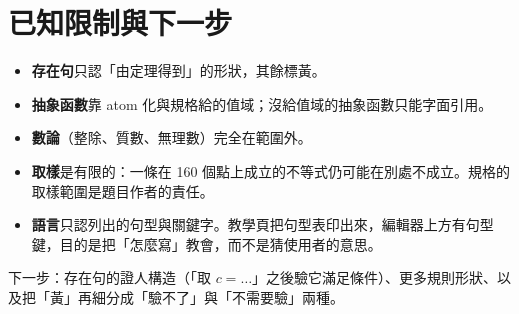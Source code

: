 \documentclass[11pt,a4paper,oneside]{book}
\renewcommand{\_}{\ifmmode\origunderscore\else\textunderscore\allowbreak\fi}
\newcommand{\chapterlabel}{第\,\thechapter\,章}
\begin{document}
\chapter{已知限制與下一步}
\begin{itemize}
  \item \textbf{存在句}只認「由定理得到」的形狀，其餘標黃。
  \item \textbf{抽象函數}靠 atom 化與規格給的值域；沒給值域的抽象函數只能字面引用。
  \item \textbf{數論}（整除、質數、無理數）完全在範圍外。
  \item \textbf{取樣}是有限的：一條在 160 個點上成立的不等式仍可能在別處不成立。規格的取樣範圍是題目作者的責任。
  \item \textbf{語言}只認列出的句型與關鍵字。教學頁把句型表印出來，編輯器上方有句型鍵，目的是把「怎麼寫」教會，而不是猜使用者的意思。
\end{itemize}
下一步：存在句的證人構造（「取 $c = \ldots$」之後驗它滿足條件）、更多規則形狀、以及把「黃」再細分成「驗不了」與「不需要驗」兩種。

\appendix
\renewcommand{\chapterlabel}{附錄\,\thechapter}
\end{document}
